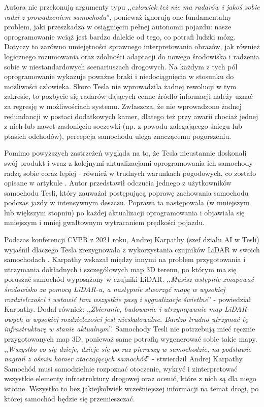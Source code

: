 Autora nie przekonują argumenty typu ,,\textit{człowiek też nie ma radarów i jakoś sobie radzi z prowadzeniem samochodu}'', ponieważ ignorują one fundamentalny problem, jaki przeszkadza w osiągnięciu pełnej autonomii pojazdu: nasze oprogramowanie wciąż jest bardzo dalekie od tego, co potrafi ludzki mózg. Dotyczy to zarówno umiejętności sprawnego interpretowania obrazów, jak również logicznego rozumowania oraz zdolności adaptacji do nowego środowiska i radzenia sobie w niestandardowych scenariuszach drogowych. Na każdym z tych pól oprogramowanie wykazuje poważne braki i niedociągnięcia w stosunku do możliwości człowieka. Skoro Tesla nie wprowadziła żadnej rewolucji w tym zakresie, to pozbycie się radarów dających cenne źródło informacji należy uznać za regresję w możliwościach systemu. Zwłaszcza, że nie wprowadzono żadnej redundancji w postaci dodatkowych kamer, dlatego też przy awarii chociaż jednej z nich lub nawet zasłonięciu soczewki (np. z powodu zalegającego śniegu lub ptasich odchodów), percepcja samochodu ulega znaczącemu pogorszeniu.

Pomimo powyższych zastrzeżeń wygląda na to, że Tesla nieustannie doskonali swój produkt i wraz z kolejnymi aktualizacjami oprogramowania ich samochody radzą sobie coraz lepiej - również w trudnych warunkach pogodowych, co zostało opisane w artykule \cite{klender:teslaOnHeavyRain}. Autor przedstawił odczucia jednego z użytkowników samochodu Tesli, który zauważał postępującą poprawę zachowania samochodu podczas jazdy w intensywnym deszczu. Poprawa ta następowała (w mniejszym lub większym stopniu) po każdej aktualizacji oprogramowania i objawiała się mniejszym i mniej gwałtownym wytracaniem prędkości pojazdu.

Podczas konferencji CVPR z 2021 roku, Andrej Karpathy (szef działu AI w Tesli) wyjaśnił dlaczego Tesla zrezygnowała z wykorzystania czujników LiDAR w swoich samochodach \cite{dickson:teslaDontNeedLidar}. Karpathy wskazał między innymi na problem przygotowania i utrzymania dokładnych i szczegółowych map 3D terenu, po którym ma się poruszać samochód wyposażony w czujniki LiDAR. ,,\textit{Musisz wstępnie zmapować środowisko za pomocą LiDAR-u, a następnie stworzyć mapę w wysokiej rozdzielczości i wstawić tam wszystkie pasy i sygnalizacje świetlne}'' - powiedział Karpathy. Dodał również: ,,\textit{Zbieranie, budowanie i utrzymywanie map LiDAR-owych w wysokiej rozdzielczości jest nieskalowalne. Bardzo trudno utrzymać tę infrastrukturę w stanie aktualnym}''. Samochody Tesli nie potrzebują mieć ręcznie przygotowanych map 3D, ponieważ same potrafią wygenerować sobie takie mapy. ,,\textit{Wszystko co się dzieje, dzieje się po raz pierwszy w samochodzie, na podstawie nagrań z ośmiu kamer otaczających samochód}'' - stwierdził Andrej Karpathy. Samochód musi samodzielnie rozpoznać otoczenie, wykryć i zinterpretować wszystkie elementy infrastruktury drogowej oraz ocenić, które z nich są dla niego istotne. Wszystko to bez jakiejkolwiek wcześniejszej informacji na temat drogi, po której samochód będzie się przemieszczać.

